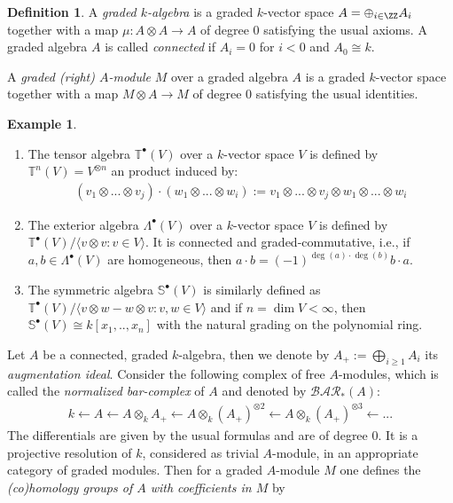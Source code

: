 \documentclass{amsart}
\theoremstyle{definition}
\newtheorem{defn}[thm]{Definition}
\newtheorem{exmp}[thm]{Example}
\theoremstyle{remark}
\numberwithin{equation}{section}
\begin{document}
\begin{defn}
    A \emph{graded $k$-algebra} is a graded $k$-vector space $A=\oplus_{i\in \ZZ}A_i$ together with a map $\mu:A\otimes A\to A$ of degree $0$ satisfying the usual axioms. A graded algebra $A$ is called \emph{connected} if $A_i=0$ for $i<0$ and $A_0\cong k$.
    
    A \emph{graded (right) $A$-module} $M$ over a graded algebra $A$ is a graded $k$-vector space together with a map $M\otimes A\to M$ of degree $0$ satisfying the usual identities.
\end{defn}
\begin{exmp}
    \begin{enumerate}
        \item The tensor algebra $\mathbb{T}^\bullet(V)$ over a $k$-vector space $V$ is defined by $\mathbb{T}^n(V)=V^{\otimes n}$ an product induced by:
        \begin{align*}
            (v_1\otimes ...\otimes v_j)\cdot (w_1\otimes ...\otimes w_i):=v_1\otimes ...\otimes v_j\otimes w_1\otimes ...\otimes w_i
        \end{align*}
        \item The exterior algebra $\Lambda^\bullet(V)$ over a $k$-vector space $V$ is defined by $\mathbb{T}^\bullet(V)/\langle v\otimes v : v\in V\rangle$. It is connected and graded-commutative, i.e., if $a,b\in \Lambda^\bullet(V)$ are homogeneous, then $a\cdot b=(-1)^{\deg(a)\cdot \deg(b)}b\cdot a$.
        \item The symmetric algebra $\mathbb{S}^\bullet(V)$ is similarly defined as $\mathbb{T}^\bullet(V)/\langle v\otimes w-w\otimes v:v,w\in V\rangle$ and if $n=\dim V<\infty$, then $\mathbb{S}^\bullet(V)\cong k[x_1,..,x_n]$ with the natural grading on the polynomial ring.
    \end{enumerate}
\end{exmp}
Let $A$ be a connected, graded $k$-algebra, then we denote by $A_+:=\bigoplus_{i\geq 1}A_i$ its \emph{augmentation ideal}. Consider the following complex of free $A$-modules, which is called the \emph{normalized bar-complex} of $A$ and denoted by $\mathcal{BAR}_*(A)$:
\begin{align*}
     k\leftarrow A\leftarrow  A\otimes_k A_+\leftarrow  A\otimes_k(A_+)^{\otimes 2}\leftarrow A\otimes_k(A_+)^{\otimes 3}\leftarrow ...
\end{align*}
The differentials are given by the usual formulas and are of degree $0$. It is a projective resolution of $k$, considered as trivial $A$-module, in an appropriate category of graded modules. Then for a graded $A$-module $M$ one defines the \emph{(co)homology groups of $A$ with coefficients in $M$} by
\end{document}
